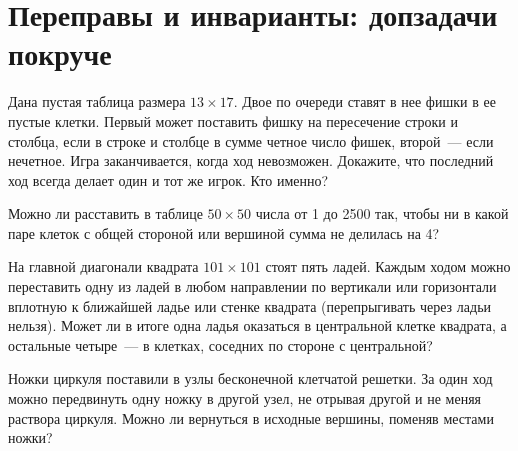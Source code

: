 
\section*{Переправы и инварианты: допзадачи покруче}




\begin{problems}

Дана пустая таблица размера $13 \times 17$.
Двое по очереди ставят в нее фишки в ее пустые клетки.
Первый может поставить фишку на пересечение строки и столбца, если в строке
и столбце в сумме четное число фишек, второй~--- если нечетное.
Игра заканчивается, когда ход невозможен.
Докажите, что последний ход всегда делает один и тот же игрок.
Кто именно?

Можно ли расставить в таблице $50 \times 50$ числа от 1 до 2500 так, чтобы
ни в какой паре клеток с общей стороной или вершиной сумма не делилась на 4?

На главной диагонали квадрата $101 \times 101$ стоят пять ладей.
Каждым ходом можно переставить одну из ладей в любом направлении по вертикали
или горизонтали вплотную к ближайшей ладье или стенке квадрата
(перепрыгивать через ладьи нельзя).
Может ли в итоге одна ладья оказаться в центральной клетке квадрата,
а остальные четыре~--- в клетках, соседних по стороне с центральной?

Ножки циркуля поставили в узлы бесконечной клетчатой решетки.
За один ход можно передвинуть одну ножку в другой узел, не отрывая другой
и не меняя раствора циркуля.
Можно ли вернуться в исходные вершины, поменяв местами ножки?

\end{problems}

